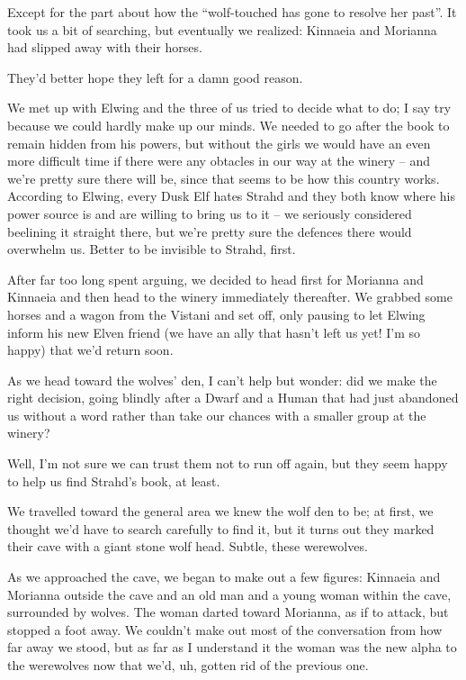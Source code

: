 Except for the part about how the ``wolf-touched has gone to resolve her past''. It took us a bit of searching, but eventually we realized: Kinnaeia and Morianna had slipped away with their horses.

They'd better hope they left for a damn good reason.

We met up with Elwing and the three of us tried to decide what to do; I say try because we could hardly make up our minds. We needed to go after the book to remain hidden from his powers, but without the girls we would have an even more difficult time if there were any obtacles in our way at the winery -- and we're pretty sure there will be, since that seems to be how this country works. According to Elwing, every Dusk Elf hates Strahd and they both know where his power source is and are willing to bring us to it -- we seriously considered beelining it straight there, but we're pretty sure the defences there would overwhelm us. Better to be invisible to Strahd, first.

After far too long spent arguing, we decided to head first for Morianna and Kinnaeia and then head to the winery immediately thereafter. We grabbed some horses and a wagon from the Vistani and set off, only pausing to let Elwing inform his new Elven friend (we have an ally that hasn't left us yet! I'm so happy) that we'd return soon.

As we head toward the wolves' den, I can't help but wonder: did we make the right decision, going blindly after a Dwarf and a Human that had just abandoned us without a word rather than take our chances with a smaller group at the winery?

\pause

Well, I'm not sure we can trust them not to run off again, but they seem happy to help us find Strahd's book, at least.

We travelled toward the general area we knew the wolf den to be; at first, we thought we'd have to search carefully to find it, but it turns out they marked their cave with a giant stone wolf head. Subtle, these werewolves.

As we approached the cave, we began to make out a few figures: Kinnaeia and Morianna outside the cave and an old man and a young woman within the cave, surrounded by wolves. The woman darted toward Morianna, as if to attack, but stopped a foot away. We couldn't make out most of the conversation from how far away we stood, but as far as I understand it the woman was the new alpha to the werewolves now that we'd, uh, gotten rid of the previous one.

